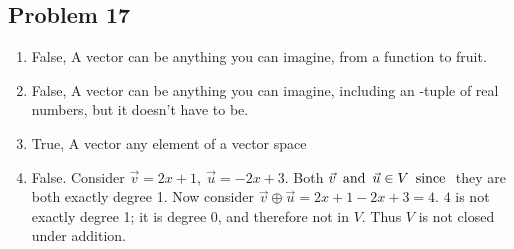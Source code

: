 \documentclass{article}
\begin{document}
\subsection*{Problem 17}
\begin{enumerate}
     
    \item[] False, A vector can be anything you can imagine, from a function to fruit.
         
    \item[] False, A vector can be anything you can imagine, including an -tuple of real numbers, but it doesn't have to be.
         
    \item[] True, A vector  any element of a vector space
         
    \item[] False. Consider $\vec{v} = 2x + 1,~\vec{u} = -2x +3$. Both $\vec{v} \operatorname{~\text{and}~} \vec{u} \in V \operatorname{~\text{since}~}$ they are both exactly degree 1. Now consider $\vec{v} \oplus \vec{u} = 2x +1 -2x +3 = 4$. $4$ is not exactly degree 1; it is degree 0, and therefore not in $V$. Thus $V$ is not closed under addition.
\end{enumerate}
\end{document}
